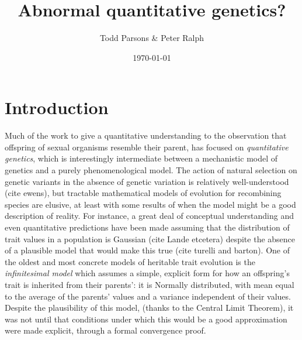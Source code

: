 \documentclass{article}
\theoremstyle{remark}
\theoremstyle{definition}
\begin{document}
\title{\large{\bf
    Abnormal quantitative genetics?
}}

\author{ \begin{small}
    Todd Parsons \&
    Peter Ralph
\end{small}}

\date{\today}
\maketitle

\begin{abstract}
\end{abstract}

\section{Introduction}

Much of the work to give a quantitative understanding to the observation that
offspring of sexual organisms resemble their parent,
has focused on \emph{quantitative genetics},
which is interestingly intermediate between a mechanistic model of genetics
and a purely phenomenological model.
The action of natural selection on genetic variants in the absence of genetic variation
is relatively well-understood (cite ewens),
but tractable mathematical models of evolution for recombining species
are elusive,
at least with some results of when the model might be a good description of reality.
For instance, a great deal of conceptual understanding and even quantitative predictions
have been made assuming that the distribution of trait values in a population is Gaussian
(cite Lande etcetera)
despite the absence of a plausible model that would make this true (cite turelli and barton).
One of the oldest and most concrete models of heritable trait evolution is the \emph{infinitesimal model}
which assumes a simple, explicit form for how an offspring's trait is inherited from their parents':
it is Normally distributed, with mean equal to the average of the parents' values
and a variance independent of their values.
Despite the plausibility of this model,
(thanks to the Central Limit Theorem),
it was not until \citet{barton2017infinitesimal} that conditions under which this would be a good approximation
were made explicit,
through a formal convergence proof.
\end{document}
